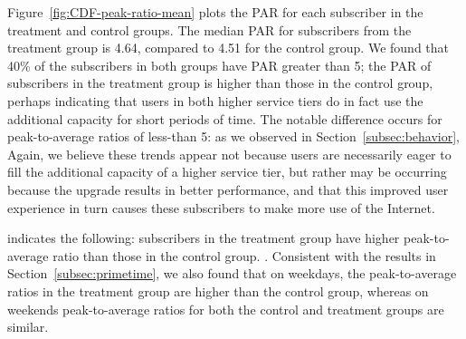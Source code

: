 Figure~\ref{fig:CDF-peak-ratio-mean} plots the PAR for each 
subscriber in the treatment and control groups. The median PAR
 for subscribers from the treatment group is 4.64, compared to 4.51
for the control group.
We found that 40\% of the subscribers in both groups have PAR
greater than 5; the PAR of subscribers in the treatment group is higher than those in the
control group, perhaps indicating that users in both higher service tiers do
in fact use the additional capacity for short periods of time. The
notable difference occurs for peak-to-average ratios of less-than 5: as
we observed in Section~\ref{subsec:behavior},   Again, we believe these trends
appear not because users are necessarily eager to fill the additional
capacity of a higher service tier, but rather may be occurring because the upgrade
results in better performance, and that this improved user experience in
turn causes these subscribers to make more use of the Internet.

 indicates the following:
subscribers in the treatment group have higher peak-to-average ratio than
those in the control group. .  Consistent with the results in
Section~\ref{subsec:primetime}, we also found that on weekdays, the
peak-to-average ratios in the treatment group are higher than the control
group, whereas on weekends peak-to-average ratios for both the control and
treatment groups are similar. 